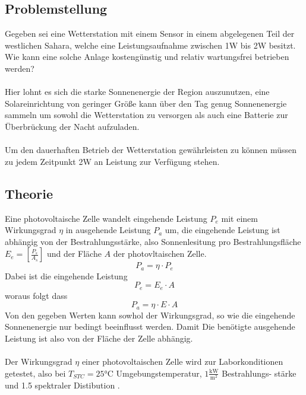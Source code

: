 \subsection{Problemstellung}
    Gegeben sei eine Wetterstation mit einem Sensor in einem abgelegenen
    Teil der westlichen Sahara, welche eine Leistungsaufnahme zwischen
    1W bis 2W besitzt. Wie kann eine solche Anlage kostengünstig und
    relativ wartungsfrei betrieben werden?
    \\\\
    Hier lohnt es sich die starke Sonnenenergie der Region
    auszunutzen, eine Solareinrichtung von geringer Größe kann über
    den Tag genug Sonnenenergie sammeln um sowohl die Wetterstation zu
    versorgen als auch eine Batterie zur Überbrückung der Nacht
    aufzuladen.
    \\\\
    Um den dauerhaften Betrieb der Wetterstation gewährleisten zu können
    müssen zu jedem Zeitpunkt 2W an Leistung zur Verfügung stehen.

\subsection{Theorie}
    Eine photovoltaische Zelle wandelt eingehende Leistung \( P_e \)
    mit einem Wirkungsgrad \( \eta \) in ausgehende Leistung \( P_a \)
    um, die eingehende Leistung ist abhängig von der Bestrahlungsstärke,
    also Sonnenlesitung pro Bestrahlungsfläche \( E_e = [\frac{P_s}
    {A_s}] \) und der Fläche \( A \) der photovltaischen Zelle.
        \[ P_a = \eta \cdot P_e \]
    Dabei ist die eingehende Leistung
        \[ P_e = E_e \cdot A\]
    woraus folgt dass
        \[ P_a = \eta \cdot E \cdot A \]
    Von den gegeben Werten kann sowhol der Wirkungsgrad, so wie die
    eingehende Sonnenenergie nur bedingt beeinflusst werden. Damit
    Die benötigte ausgehende Leistung ist also von der Fläche der
    Zelle abhängig.
    \\\\
    Der Wirkungsgrad \( \eta \) einer photovoltaischen Zelle wird zur
    Laborkonditionen getestet, also bei \( T_{STC} = 25 \)°C
    Umgebungstemperatur, \( 1 \mathrm{\frac{kW}{m^2}} \) Bestrahlungs-
    stärke und 1.5 spektraler Distibution \cite{Wiki_SolarEfficiency}.
    \newpage

